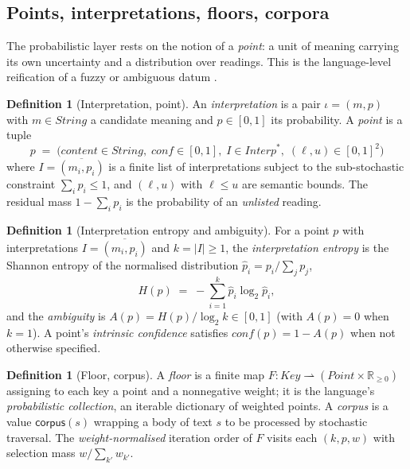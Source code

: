 \documentclass[11pt,a4paper]{article}
\theoremstyle{plain}
\theoremstyle{definition}
\newtheorem{definition}[theorem]{Definition}
\theoremstyle{remark}
\newcommand{\Unit}{[0,1]}
\begin{document}
\subsection{Points, interpretations, floors, corpora}
\label{sec:points}

The probabilistic layer rests on the notion of a \emph{point}: a unit of
meaning carrying its own uncertainty and a distribution over readings. This is
the language-level reification of a fuzzy or ambiguous datum
\citep{zadeh1965,hajek1998}.

\begin{definition}[Interpretation, point]
\label{def:point}
An \emph{interpretation} is a pair $\iota=(m, p)$ with $m\in\mathit{String}$ a
candidate meaning and $p\in\Unit$ its probability. A \emph{point} is a tuple
\[
p \;=\; \big(\mathit{content}\in\mathit{String},\;
              \mathit{conf}\in\Unit,\;
              I\in \mathit{Interp}^{*},\;
              (\ell,u)\in\Unit^2 \big)
\]
where $I=\overline{(m_i,p_i)}$ is a finite list of interpretations subject to
the sub-stochastic constraint $\sum_i p_i \le 1$, and $(\ell,u)$ with
$\ell\le u$ are semantic bounds. The residual mass $1-\sum_i p_i$ is the
probability of an \emph{unlisted} reading.
\end{definition}

\begin{definition}[Interpretation entropy and ambiguity]
\label{def:entropy}
For a point $p$ with interpretations $I=\overline{(m_i,p_i)}$ and $k=|I|\ge1$,
the \emph{interpretation entropy} is the Shannon entropy
\citep{shannon1948} of the normalised distribution
$\hat p_i = p_i/\sum_j p_j$,
\[
H(p) \;=\; -\sum_{i=1}^{k}\hat p_i \log_2 \hat p_i,
\]
and the \emph{ambiguity} is $A(p)=H(p)/\log_2 k\in\Unit$ (with $A(p)=0$ when
$k=1$). A point's \emph{intrinsic confidence} satisfies
$\mathit{conf}(p) = 1 - A(p)$ when not otherwise specified.
\end{definition}

\begin{definition}[Floor, corpus]
\label{def:floor}
A \emph{floor} is a finite map $F\colon \mathit{Key}\rightharpoonup
(\mathit{Point}\times\mathbb{R}_{\ge0})$ assigning to each key a point and a
nonnegative weight; it is the language's \emph{probabilistic collection}, an
iterable dictionary of weighted points. A \emph{corpus} is a value
$\mathsf{corpus}(s)$ wrapping a body of text $s$ to be processed by stochastic
traversal. The \emph{weight-normalised} iteration order of $F$ visits each
$(k, p, w)$ with selection mass $w/\sum_{k'} w_{k'}$.
\end{definition}
\end{document}

